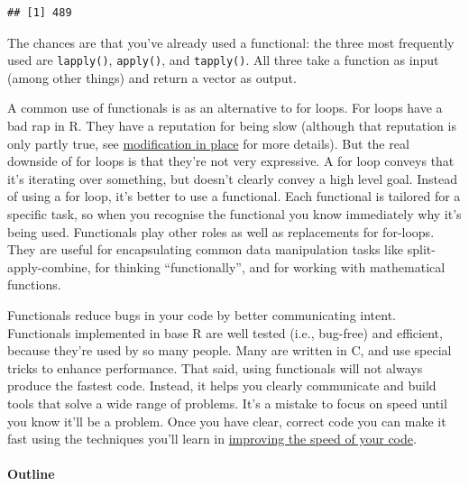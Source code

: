 \begin{verbatim}
## [1] 489
\end{verbatim}

The chances are that you've already used a functional: the three most
frequently used are \texttt{lapply()}, \texttt{apply()}, and
\texttt{tapply()}. All three take a function as input (among other
things) and return a vector as output.

A common use of functionals is as an alternative to for loops. For loops
have a bad rap in R. They have a reputation for being slow (although
that reputation is only partly true, see
\protect\hyperlink{modification}{modification in place} for more
details). But the real downside of for loops is that they're not very
expressive. A for loop conveys that it's iterating over something, but
doesn't clearly convey a high level goal. Instead of using a for loop,
it's better to use a functional. Each functional is tailored for a
specific task, so when you recognise the functional you know immediately
why it's being used. Functionals play other roles as well as
replacements for for-loops. They are useful for encapsulating common
data manipulation tasks like split-apply-combine, for thinking
``functionally'', and for working with mathematical functions.

Functionals reduce bugs in your code by better communicating intent.
Functionals implemented in base R are well tested (i.e., bug-free) and
efficient, because they're used by so many people. Many are written in
C, and use special tricks to enhance performance. That said, using
functionals will not always produce the fastest code. Instead, it helps
you clearly communicate and build tools that solve a wide range of
problems. It's a mistake to focus on speed until you know it'll be a
problem. Once you have clear, correct code you can make it fast using
the techniques you'll learn in \protect\hyperlink{profiling}{improving
the speed of your code}.

\hypertarget{outline}{%
\paragraph{Outline}\label{outline}}

